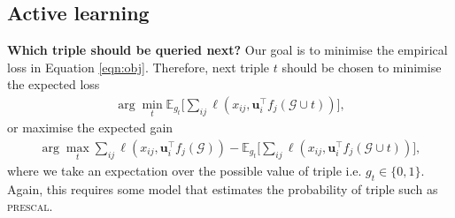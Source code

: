 \documentclass{article} %
\theoremstyle{definition}
\newcommand\mc{\mathcal} %
\newcommand\ts{\mathcal} %
\newcommand\mt{} %
\newcommand\vt{\mathbf} %
\newcommand\fn{} %
\newcommand\triple[3]{(#1 \stackrel{#2}\rightarrow #3)}
\begin{document}

\subsection{Active learning}
\textbf{Which triple should be queried next?} Our goal is to minimise the empirical loss in Equation \ref{eqn:obj}. Therefore, next triple $t$ should be chosen to minimise the expected loss
\begin{align}
\arg\min_t \mathbb{E}_{g_t}\bigg[\sum_{ij}\ell(x_{ij}, \vt{u}_{i}^\top  \fn{f}_j(\ts{G} \cup t))\bigg],
\end{align}
or maximise the expected gain
\begin{align}
\arg\max_t \sum_{ij}\ell(x_{ij}, \vt{u}_{i}^\top  \fn{f}_j(\ts{G})) - \mathbb{E}_{g_t}\bigg[\sum_{ij}\ell(x_{ij}, \vt{u}_{i}^\top  \fn{f}_j(\ts{G} \cup t))\bigg],
\end{align}
where we take an expectation over the possible value of triple i.e. $g_t \in \{0, 1\}$. Again, this requires some model that estimates the probability of triple such as \textsc{prescal}.
\end{document}
